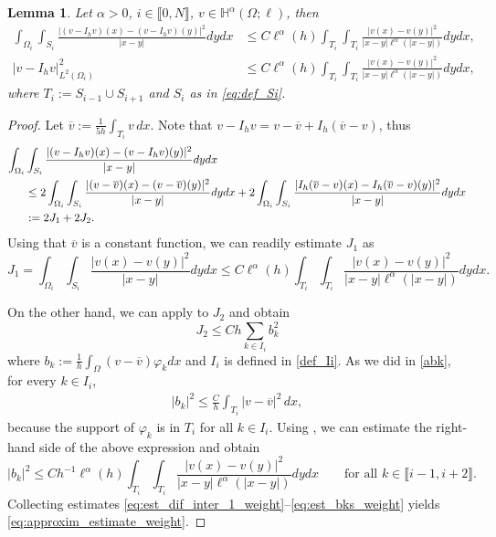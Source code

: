 \documentclass[10 pt]{article}
\newcommand\inter[1]{\llbracket #1\rrbracket}
\newtheorem{lemma}[theorem]{Lemma}
\numberwithin{equation}{section}
\newcommand{\weH}[1]{\mathbb H^{#1}(\Omega;\ell)}
\begin{document}
\begin{lemma}\label{lem:stab_dif_interp_weight}
Let $\alpha>0$, $i\in\inter{0,N}$, $v\in \weH{\alpha}$, then
\begin{align}
    \int_{\Omega_i}\int_{S_i}\frac{|(v-I_h v)(x)-(v-I_h v)(y)|^2}{|x-y|}dy dx &\leq C  \ell^{\alpha}(h)\int_{T_i}\int_{T_{i}}\frac{|v(x)-v(y)|^2}{|x-y|\ell^{\alpha}(|x-y|)}dy dx, \label{eq:approxim_estimate_weight}\\
    |v-I_h v|_{L^2(\Omega_i)}^2&\leq C\ell^{\alpha}(h)\int_{T_{i}}\int_{T_{i}}\frac{|v(x)-v(y)|^2}{|x-y|\ell^{\alpha}(|x-y|)}dy dx,\label{a4}
\end{align}
where $T_i:=S_{i-1}\cup S_{i+1}$ and $S_i$ as in \eqref{eq:def_Si}.
\end{lemma}
%
\begin{proof}
Let $\overline{v}:=\frac{1}{5h}\int_{T_{i}} v\, dx$. Note that $v-I_h v=v-\overline{v}+I_h(\overline v - v)$, thus
%
\begin{align}\notag
    \int_{\Omega_i}&\int_{S_i}\frac{|(v-I_h v)(x)-(v-I_h v)(y)|^2}{|x-y|} dy dx \\ \notag
    &\leq 2\int_{\Omega_i}\int_{S_i}\frac{|(v-\overline{v})(x)-(v-\overline{v})(y)|^2}{|x-y|}dy dx + 2 \int_{\Omega_i}\int_{S_i}\frac{|I_h(\overline v-{v})(x)-I_h(\overline v-{v})(y)|^2}{|x-y|}dy dx \\ \label{eq:est_dif_inter_1_weight}
    &:=2J_1+2J_2.
\end{align}
%
Using that $\overline v$ is a constant function, we can readily estimate $J_1$ as
%
\begin{equation}\label{eq:est_J1_weight}
    J_1 = \int_{\Omega_i}\int_{S_i}\frac{|v(x)-v(y)|^2}{|x-y|}dy dx \leq C\ell^{\alpha}(h)\int_{T_i}\int_{T_i}\frac{|v(x)-v(y)|^2}{|x-y|\ell^{\alpha}(|x-y|)}dy dx.
\end{equation}

On the other hand, we can apply  to $J_2$ and obtain
%
\begin{equation}\label{eq:est_J2_weight}
    J_2 \leq Ch\sum_{k\in I_i} b_k^2
\end{equation}
%
where $b_k:=\frac{1}{h}\int_{\Omega}(v-\overline v)\varphi_k dx$ and $I_i$ is defined in \eqref{def_Ii}. As we did in \eqref{abk}, for every $k\in I_i$,
\begin{align*}
    |b_k|^2\leq \frac{C}{h}\int_{T_{i}}|v-\overline{v}|^2\, dx,
\end{align*}
because the support of $\varphi_k$ is in $T_{i}$ for all $k\in I_i$. Using , we can estimate the right-hand side of the above expression and obtain
%
\begin{equation}\label{eq:est_bks_weight}
    |b_k|^2\leq Ch^{-1}\ell^{\alpha}(h)\int_{T_{i}}\int_{T_{i}}\frac{|v(x)-v(y)|^2}{|x-y|\ell^{\alpha}(|x-y|)}dy dx\qquad \text{for all $k\in \inter{i-1,i+2}$}.
\end{equation}
%
Collecting estimates \eqref{eq:est_dif_inter_1_weight}--\eqref{eq:est_bks_weight} yields \eqref{eq:approxim_estimate_weight}. 


\end{proof}
\end{document}
